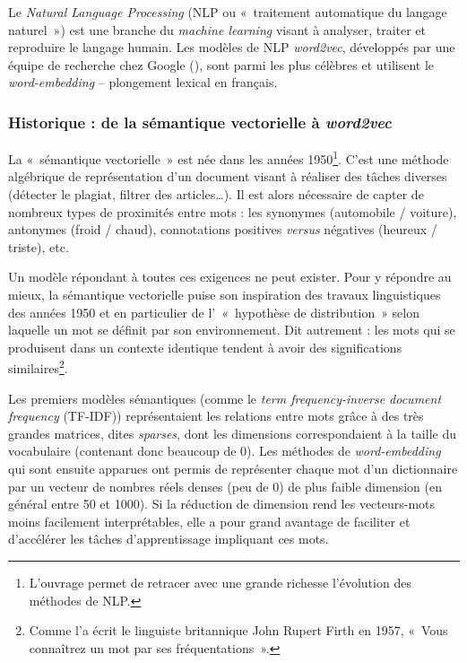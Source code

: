 \documentclass[11pt,french,french]{article}
\let\rmarkdownfootnote\footnote%
\def\footnote{\protect\rmarkdownfootnote}
\begin{document}
Le \emph{Natural Language Processing} (NLP ou «~traitement automatique
du langage naturel~») est une branche du \emph{machine learning} visant
à analyser, traiter et reproduire le langage humain. Les modèles de NLP
\emph{word2vec}, développés par une équipe de recherche chez Google
(\cite{Mikolov}), sont parmi les plus célèbres et utilisent le
\emph{word-embedding} -- plongement lexical en français.

\subsubsection{\texorpdfstring{Historique : de la sémantique vectorielle
à
\emph{word2vec}}{Historique : de la sémantique vectorielle à word2vec}}\label{historique-de-la-suxe9mantique-vectorielle-uxe0-word2vec}

La «~sémantique vectorielle~» est née dans les années 1950\footnote{L'ouvrage
  \cite{Jurafsky} permet de retracer avec une grande richesse
  l'évolution des méthodes de NLP.}. C'est une méthode algébrique de
représentation d'un document visant à réaliser des tâches diverses
(détecter le plagiat, filtrer des articles\dots). Il est alors
nécessaire de capter de nombreux types de proximités entre mots : les
synonymes (automobile / voiture), antonymes (froid / chaud),
connotations positives \emph{versus} négatives (heureux / triste), etc.

Un modèle répondant à toutes ces exigences ne peut exister. Pour y
répondre au mieux, la sémantique vectorielle puise son inspiration des
travaux linguistiques des années 1950 et en particulier de
l'~«~hypothèse de distribution~» selon laquelle un mot se définit par
son environnement. Dit autrement : les mots qui se produisent dans un
contexte identique tendent à avoir des significations
similaires\footnote{Comme l'a écrit le linguiste britannique John Rupert
  Firth en 1957, «~Vous connaîtrez un mot par ses fréquentations~».}.

Les premiers modèles sémantiques (comme le \emph{term frequency-inverse
document frequency} (TF-IDF)) représentaient les relations entre mots
grâce à des très grandes matrices, dites \emph{sparses}, dont les
dimensions correspondaient à la taille du vocabulaire (contenant donc
beaucoup de 0). Les méthodes de \emph{word-embedding} qui sont ensuite
apparues ont permis de représenter chaque mot d'un dictionnaire par un
vecteur de nombres réels denses (peu de 0) de plus faible dimension (en
général entre 50 et 1000). Si la réduction de dimension rend les
vecteurs-mots moins facilement interprétables, elle a pour grand
avantage de faciliter et d'accélérer les tâches d'apprentissage
impliquant ces mots.
\end{document}
